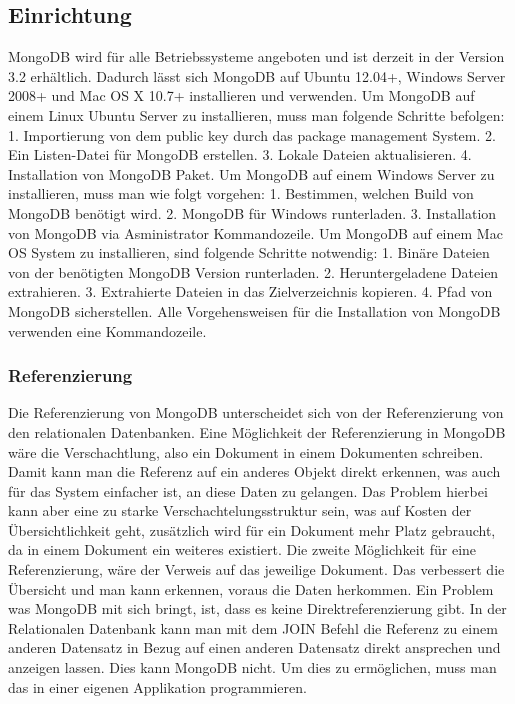 \subsection{Einrichtung}
MongoDB wird für alle Betriebssysteme angeboten und ist derzeit in der Version 3.2 erhältlich. Dadurch lässt sich MongoDB auf Ubuntu 12.04+, Windows Server 2008+ und Mac OS X 10.7+ installieren und verwenden. 
Um MongoDB auf einem Linux Ubuntu Server zu installieren, muss man folgende Schritte befolgen:
1. Importierung von dem public key durch das package management System.
2. Ein Listen-Datei für MongoDB erstellen.
3. Lokale Dateien aktualisieren.
4. Installation von MongoDB Paket.
Um MongoDB auf einem Windows Server zu installieren, muss man wie folgt vorgehen:
1. Bestimmen, welchen Build von MongoDB benötigt wird.
2. MongoDB für Windows runterladen.
3. Installation von MongoDB via Asministrator Kommandozeile.
Um MongoDB auf einem Mac OS System zu installieren, sind folgende Schritte notwendig:
1. Binäre Dateien von der benötigten MongoDB Version runterladen.
2. Heruntergeladene Dateien extrahieren.
3. Extrahierte Dateien in das Zielverzeichnis kopieren.
4. Pfad von MongoDB sicherstellen.
Alle Vorgehensweisen für die Installation von MongoDB verwenden eine Kommandozeile.
\subsubsection{Referenzierung}
Die Referenzierung von MongoDB unterscheidet sich von der Referenzierung von den relationalen Datenbanken. Eine Möglichkeit der Referenzierung in MongoDB wäre die Verschachtlung, also ein Dokument in einem Dokumenten schreiben. Damit kann man die Referenz auf ein anderes Objekt direkt erkennen, was auch für das System einfacher ist, an diese Daten zu gelangen. Das Problem hierbei kann aber eine zu starke Verschachtelungsstruktur sein, was auf Kosten der Übersichtlichkeit geht, zusätzlich wird für ein Dokument mehr Platz gebraucht, da in einem Dokument ein weiteres existiert. Die zweite Möglichkeit für eine Referenzierung, wäre der Verweis auf das jeweilige Dokument. Das verbessert die Übersicht und man kann erkennen, voraus die Daten herkommen. Ein Problem was MongoDB mit sich bringt, ist, dass es keine Direktreferenzierung gibt. In der Relationalen Datenbank kann man mit dem JOIN Befehl die Referenz zu einem anderen Datensatz in Bezug auf einen anderen Datensatz direkt ansprechen und anzeigen lassen. Dies kann MongoDB nicht. Um dies zu ermöglichen, muss man das in einer eigenen Applikation programmieren. 
